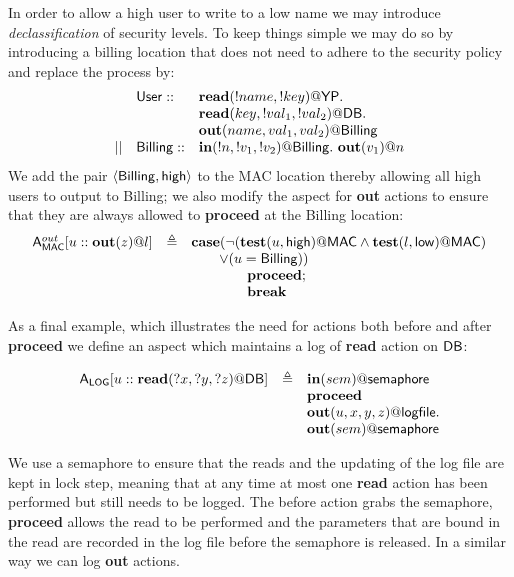 \documentclass[a4paper]{llncs}
\newcommand{\netpar}{\mid\mid}
\begin{document}
\begin{example}
In order to allow a high user to write to a low name we may introduce 
{\em declassification} 
of security levels. To keep things simple we may do so by
introducing a billing location
that does not need to adhere to the security policy and replace the process by:
$$
\begin{array}{lll}
& {\sf User} :: & {\bf read}(!name,!key)@{\DBpub}.\\ 
& & {\bf read}(key,!val_1,!val_2)@{\DBsec}.\\
& & {\bf out}(name,val_1,val_2)@{\sf Billing}\\
\netpar & 
{\sf Billing} :: & {\bf in}(!n,!v_1,!v_2)@{\sf Billing}.\ {\bf out}(v_1)@{n}
\end{array}
$$
We add the pair $\langle {\sf Billing},{\sf high}\rangle$ to the {\sf MAC} 
location thereby
allowing all high users to output to {\sf Billing}; 
we also modify the aspect for {\bf out} actions to ensure that they
are always allowed to {\bf proceed} at the {\sf Billing} location:
$$
\begin{array}{rcl}\small
{\sf A}_{\sf MAC}^{out}[u::{\bf out}(z)@l] 
& \triangleq & {\bf case}(\neg ({\bf test}(u,{\sf high})@{\sf MAC} \wedge 
                                 {\bf test}(l,{\sf low})@{\sf MAC})\\
& & \qquad \vee (u = {\sf Billing}))\\ 
& & \qquad \qquad {\bf proceed};\\
&& \qquad \qquad {\bf break}
\end{array}
$$
\end{example}


\begin{example}\label{ex6}
As a final example, which illustrates the need for actions both before and 
after {\bf proceed} we define an aspect which maintains a log of
{\bf read} action on ${{\sf DB}}$:

$$
\begin{array}{rcl}
{\sf A}_{\sf LOG}[u::{\bf read}(?x,?y,?z)@{{\sf DB}}]
& \triangleq &
{\bf in}({sem}) @ {\sf semaphore}\\
& & {\bf proceed}\\
& & {\bf out}(u,x,y,z)@{\sf logfile}.\\
& & {\bf out}({sem}) @ {\sf semaphore}
\end{array}
$$

We use a
semaphore to ensure that the reads and the updating of the log file are kept 
in lock step, meaning that at any time at most one {\bf read}
action has been performed but still needs to be logged.  
The before action grabs the semaphore, {\bf proceed} allows the read to 
be performed
and the parameters that are bound in the read are recorded in the 
log file before
the semaphore is released.
In a similar way we can log {\bf out} actions.

\end{example}
\end{document}
